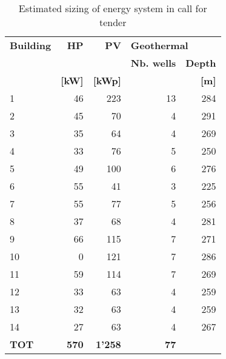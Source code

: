 \begin{table}[h!]
\centering
\caption{Estimated sizing of energy system in call for tender}\vspace{2mm}
\label{tab:ppa_prestudy} 
\begin{tabular}{lrrrr}
\toprule
\textbf{Building} & \textbf{HP}    & \textbf{PV}    & \multicolumn{2}{l}{\textbf{Geothermal}} \\
         &       &       & \textbf{Nb. wells}        & \textbf{Depth}        \\
         & \textbf{[kW]} & \textbf{[kWp] } &                 & \textbf{[m] }         \\
         \midrule
1        & 46    & 223   & 13              & 284          \\
2        & 45    & 70    & 4               & 291          \\
3        & 35    & 64    & 4               & 269          \\
4        & 33    & 76    & 5               & 250          \\
5        & 49    & 100   & 6               & 276          \\
6        & 55    & 41    & 3               & 225          \\
7        & 55    & 77    & 5               & 256          \\
8        & 37    & 68    & 4               & 281          \\
9        & 66    & 115   & 7               & 271          \\
10       & 0     & 121   & 7               & 286          \\
11       & 59    & 114   & 7               & 269          \\
12       & 33    & 63    & 4               & 259          \\
13       & 32    & 63    & 4               & 259          \\
14       & 27    & 63    & 4               & 267          \\
\midrule
\textbf{TOT}      & \textbf{570}   & \textbf{1'258} & \textbf{77}              &             \\
\bottomrule
\end{tabular}
\end{table}